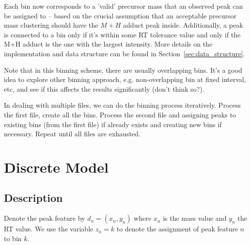 \documentclass[12pt,a4paper]{article}
\begin{document}
Each bin now corresponds to a 'valid' precursor mass that an observed peak can be assigned to -- based on the crucial assumption that an acceptable precursor mass clustering should have the $M+H$ adduct peak inside. Additionally, a peak is connected to a bin only if it's within some RT tolerance value and only if the M+H adduct is the one with the largest intensity. More details on the implementation and data structure can be found in Section~\ref{sec:data_structure}. 

Note that in this binning scheme, there are usually overlapping bins. It's a good idea to explore other binning approach, e.g. non-overlapping bin at fixed interval, etc, and see if this affects the results significantly (don't think so?). 

In dealing with multiple files, we can do the binning process iteratively. Process the first file, create all the bins. Process the second file and assigning peaks to existing bins (from the first file) if already exists and creating new bins if necessary. Repeat until all files are exhausted.

\section{Discrete Model}

\subsection{Description}

Denote the peak feature by $d_{n}=(x_{n},y_{n})$ where $x_{n}$ is the mass value and $y_{n}$ the RT value. We use the variable $z_{n}=k$ to denote the assignment of peak feature $n$ to bin $k$. 
\end{document}
